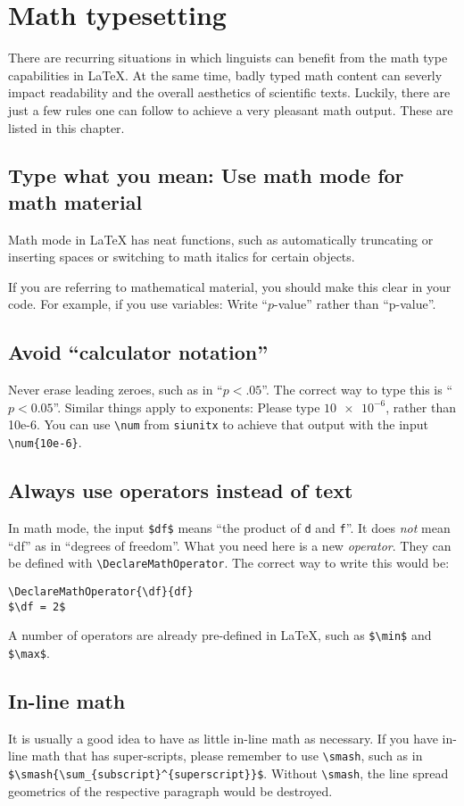 \chapter{Math typesetting}

There are recurring situations in which linguists can benefit from the math type capabilities in \LaTeX. At the same time, badly typed math content can severly impact readability and the overall aesthetics of scientific texts. Luckily, there are just a few rules one can follow to achieve a very pleasant math output. These are listed in this chapter.

\section{Type what you mean: Use math mode for math material}

Math mode in \LaTeX{} has neat functions, such as automatically truncating or inserting spaces or switching to math italics for certain objects. 

If you are referring to mathematical material, you should make this clear in your code. For example, if you use variables: Write ``$p$-value'' rather than ``p-value''.

\section{Avoid ``calculator notation''}
Never erase leading zeroes, such as in ``$p<.05$''. The correct way to type this is ``$p<0.05$''. Similar things apply to exponents: Please type $\num{10e-6}$, rather than 10e-6. You can use \verb+\num+ from \texttt{siunitx} to achieve that output with the input \verb+\num{10e-6}+.

\section{Always use operators instead of text}
In math mode, the input \verb+$df$+ means ``the product of \verb+d+ and \verb+f+''. It does \emph{not} mean ``df'' as in ``degrees of freedom''. What you need here is a new \emph{operator}. They can be defined with \verb+\DeclareMathOperator+. The correct way to write this would be:

\begin{verbatim}
\DeclareMathOperator{\df}{df}
$\df = 2$
\end{verbatim}

A number of operators are already pre-defined in \LaTeX{}, such as \verb+$\min$+ and \verb+$\max$+.

\section{In-line math}
It is usually a good idea to have as little in-line math as necessary. If you have in-line math that has super-scripts, please remember to use \verb+\smash+, such as in \verb+$\smash{\sum_{subscript}^{superscript}}$+. Without \verb+\smash+, the line spread geometrics of the respective paragraph would be destroyed.

